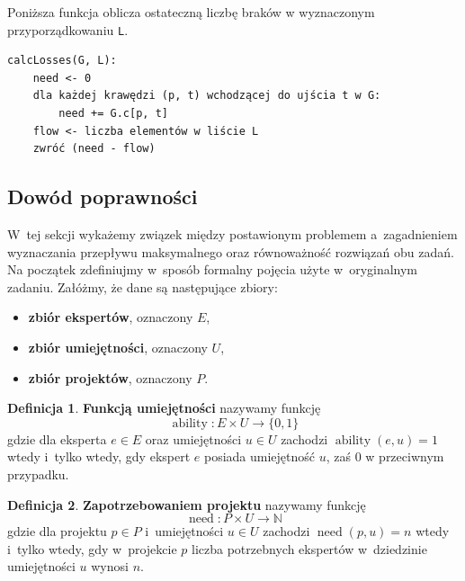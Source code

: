 \documentclass[12pt,a4paper]{article}
\theoremstyle{definition}
\newtheorem{defn}{Definicja}
\DeclareMathOperator{\ability}{ability}
\DeclareMathOperator{\need}{need}
\begin{document}
\vspace{0.5em}
\noindent
Poniższa funkcja oblicza ostateczną liczbę braków w wyznaczonym przyporządkowaniu \texttt{L}.\\

\begin{tcolorbox}[title=Wyznaczanie braków]
\begin{verbatim}
calcLosses(G, L):
    need <- 0
    dla każdej krawędzi (p, t) wchodzącej do ujścia t w G:
        need += G.c[p, t]
    flow <- liczba elementów w liście L
    zwróć (need - flow)
\end{verbatim}
\end{tcolorbox}

\subsection{Dowód poprawności}
\label{sec:correctnessproof}

W~tej sekcji wykażemy związek między postawionym problemem a~zagadnieniem
wyznaczania przepływu maksymalnego oraz równoważność rozwiązań obu zadań.\\

\noindent
Na początek zdefiniujmy w~sposób formalny pojęcia użyte w~oryginalnym zadaniu.
Załóżmy, że dane są następujące zbiory:

\begin{itemize}
	\item \textbf{zbiór ekspertów}, oznaczony $E$,
	\item \textbf{zbiór umiejętności}, oznaczony $U$,
	\item \textbf{zbiór projektów}, oznaczony $P$.
\end{itemize}

\begin{defn}
\textbf{Funkcją umiejętności} nazywamy funkcję
$$ \ability : E \times U \to \{ 0,1 \} $$
gdzie dla eksperta $e \in E$ oraz umiejętności $u \in U$ zachodzi
$\ability(e, u) = 1$ wtedy i~tylko wtedy, gdy ekspert $e$ posiada umiejętność
$u$, zaś 0 w przeciwnym przypadku.
\end{defn}

\begin{defn}
\textbf{Zapotrzebowaniem projektu} nazywamy funkcję
$$ \need : P \times U \to \mathbb{N} $$
gdzie dla projektu $p \in P$ i~umiejętności $u \in U$ zachodzi $\need(p, u) = n$
wtedy i~tylko wtedy, gdy w~projekcie $p$ liczba potrzebnych ekspertów
w~dziedzinie umiejętności $u$ wynosi $n$.
\end{defn}
\end{document}
